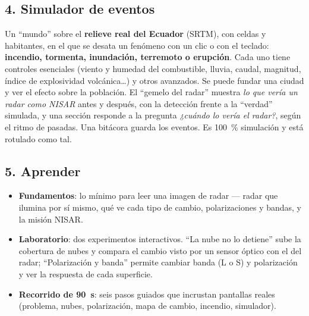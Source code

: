 \documentclass[11pt,a4paper]{article}
\begin{document}
\subsection*{4. Simulador de eventos}
Un ``mundo'' sobre el \textbf{relieve real del Ecuador} (SRTM), con celdas y habitantes, en el que se desata un fenómeno con un clic o con el teclado: \textbf{incendio, tormenta, inundación, terremoto o erupción}. Cada uno tiene controles esenciales (viento y humedad del combustible, lluvia, caudal, magnitud, índice de explosividad volcánica…) y otros avanzados. Se puede fundar una ciudad y ver el efecto sobre la población. El ``gemelo del radar'' muestra \emph{lo que vería un radar como NISAR} antes y después, con la detección frente a la ``verdad'' simulada, y una sección responde a la pregunta \emph{¿cuándo lo vería el radar?}, según el ritmo de pasadas. Una bitácora guarda los eventos. Es 100~\% simulación y está rotulado como tal.

\subsection*{5. Aprender}
\begin{itemize}
\item \textbf{Fundamentos}: lo mínimo para leer una imagen de radar --- radar que ilumina por sí mismo, qué ve cada tipo de cambio, polarizaciones y bandas, y la misión NISAR.
\item \textbf{Laboratorio}: dos experimentos interactivos. ``La nube no lo detiene'' sube la cobertura de nubes y compara el cambio visto por un sensor óptico con el del radar; ``Polarización y banda'' permite cambiar banda (L o S) y polarización y ver la respuesta de cada superficie.
\item \textbf{Recorrido de 90~s}: seis pasos guiados que incrustan pantallas reales (problema, nubes, polarización, mapa de cambio, incendio, simulador).
\end{itemize}
\end{document}

